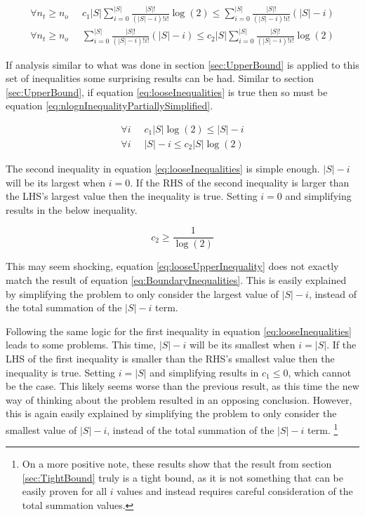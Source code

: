 \documentclass{article}
\begin{document}
\begin{equation}
    \begin{split}
        \forall n_t\ge n_o \;\; &
        c_1|S|\sum_{i=0}^{|S|}\frac{|S|!}{(|S|-i)!i!}
        \log \left( 2 \right)
        \le
        \sum_{i=0}^{|S|}\frac{|S|!}{(|S|-i)!i!}(|S|-i)
        \\
        \forall n_t\ge n_o \;\; &
        \sum_{i=0}^{|S|}\frac{|S|!}{(|S|-i)!i!}(|S|-i)
        \le
        c_2|S|\sum_{i=0}^{|S|}\frac{|S|!}{(|S|-i)!i!}
        \log \left( 2 \right)
    \end{split}
    \label{eq:nlognInequalityPartiallySimplified}
\end{equation}

If analysis similar to what was done in section \ref{sec:UpperBound} is applied to this set of inequalities some surprising results can be had. Similar to section \ref{sec:UpperBound}, if equation \ref{eq:looseInequalities} is true then so must be equation \ref{eq:nlognInequalityPartiallySimplified}.

\begin{equation}
	\begin{split}
		\forall i \;\; & c_1|S|\log(2)\le |S|-i \\
		\forall i \;\; & |S|-i\le c_2|S|\log(2)
	\end{split}
	\label{eq:looseInequalities}
\end{equation}

The second inequality in equation \ref{eq:looseInequalities} is simple enough. $|S|-i$ will be its largest when $i=0$. If the RHS of the second inequality is larger than the LHS's largest value then the inequality is true. Setting $i=0$ and simplifying results in the below inequality.

\begin{equation}
	c_2\ge \frac{1}{\log(2)}
	\label{eq:looseUpperInequality}
\end{equation}

This may seem shocking, equation \ref{eq:looseUpperInequality} does not exactly match the result of equation \ref{eq:BoundaryInequalities}. This is easily explained by simplifying the problem to only consider the largest value of $|S|-i$, instead of the total summation of the $|S|-i$ term.

Following the same logic for the first inequality in equation \ref{eq:looseInequalities} leads to some problems. This time, $|S|-i$ will be its smallest when $i=|S|$. If the LHS of the first inequality is smaller than the RHS's smallest value then the inequality is true. Setting $i=|S|$ and simplifying results in $c_1\le0$, which cannot be the case. This likely seems worse than the previous result, as this time the new way of thinking about the problem resulted in an opposing conclusion. However, this is again easily explained by simplifying the problem to only consider the smallest value of $|S|-i$, instead of the total summation of the $|S|-i$ term. \footnote{On a more positive note, these results show that the result from section \ref{sec:TightBound} truly is a tight bound, as it is not something that can be easily proven for all $i$ values and instead requires careful consideration of the total summation values.}
\end{document}
